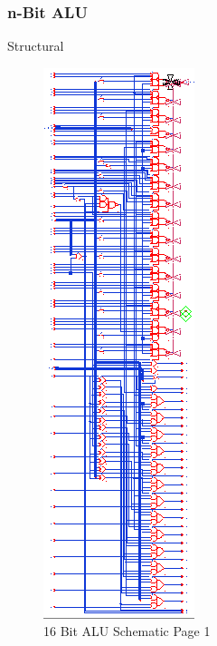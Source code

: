 \documentclass[11pt]{article}
\begin{document}
		\subsubsection{n-Bit ALU}
		
			Structural
			
			
			\begin{figure}[H]
				\centering
				\includegraphics[width=0.3\linewidth]{"Pictures/ALU-16Bit Schematic 1"}
				\caption{16 Bit ALU Schematic Page 1}
				\label{fig:alu-16bit-schematic-1}
			\end{figure}
		
\end{document}
